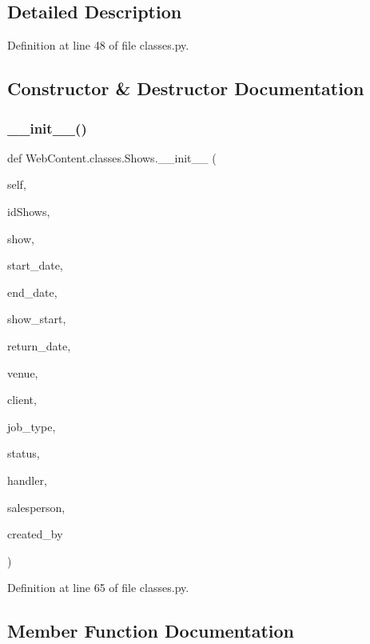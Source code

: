 \subsection{Detailed Description}


Definition at line 48 of file classes.\+py.



\subsection{Constructor \& Destructor Documentation}
\mbox{\label{class_web_content_1_1classes_1_1_shows_aa08b1c685aa53cfa043340f94e63905e}} 
\subsubsection{\texorpdfstring{\+\_\+\+\_\+init\+\_\+\+\_\+()}{\_\_init\_\_()}}
{\footnotesize\ttfamily def Web\+Content.\+classes.\+Shows.\+\_\+\+\_\+init\+\_\+\+\_\+ (\begin{DoxyParamCaption}\item[{}]{self,  }\item[{}]{id\+Shows,  }\item[{}]{show,  }\item[{}]{start\+\_\+date,  }\item[{}]{end\+\_\+date,  }\item[{}]{show\+\_\+start,  }\item[{}]{return\+\_\+date,  }\item[{}]{venue,  }\item[{}]{client,  }\item[{}]{job\+\_\+type,  }\item[{}]{status,  }\item[{}]{handler,  }\item[{}]{salesperson,  }\item[{}]{created\+\_\+by }\end{DoxyParamCaption})}



Definition at line 65 of file classes.\+py.



\subsection{Member Function Documentation}
\mbox{\label{class_web_content_1_1classes_1_1_shows_a6691b87ec53fa9349d04a41317fd1bee}} 
